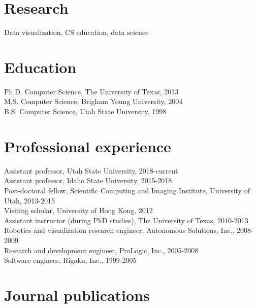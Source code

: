 \documentclass[margin,line]{res}
\begin{document}
\begin{resume}
\section{\sc Research}

Data visualization, CS education, data science

\section{\sc Education}

Ph.D. Computer Science, The University of Texas, 2013\\
M.S. Computer Science, Brigham Young University, 2004\\
B.S. Computer Science, Utah State University, 1998\\

\section{\sc Professional experience}

Assistant professor, Utah State University, 2018-current\\
Assistant professor, Idaho State University, 2015-2018\\
Post-doctoral fellow, Scientific Computing and Imaging
Institute, University of Utah, 2013-2015\\
Visiting scholar, University of Hong Kong, 2012\\
Assistant instructor (during PhD studies), The University of Texas, 2010-2013\\
Robotics and visualization research engineer, Autonomous Solutions, Inc., 2008-2009\\
Research and development engineer, ProLogic, Inc., 2005-2008 \\
Software engineer, Rigaku, Inc., 1999-2005 \\

\section{\sc Journal publications}


\end{resume}
\end{document}
